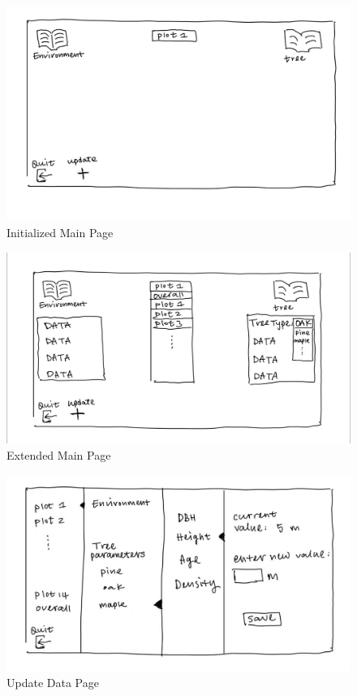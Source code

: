 \documentclass[12pt, titlepage]{article}
\begin{document}
\begin{figure}[H]
    \centering
    \includegraphics[scale=0.3]{SysDesPic/AppendixA-2.jpeg}
    \caption{Initialized Main Page}
\end{figure}

\begin{figure}[H]
    \centering
    \includegraphics[scale=0.3]{SysDesPic/AppendixA-3.jpeg}
    \caption{Extended Main Page}
\end{figure}

\begin{figure}[H]
    \centering
    \includegraphics[scale=0.4]{SysDesPic/AppendixA-4.jpeg}
    \caption{Update Data Page}
\end{figure}
\end{document}

